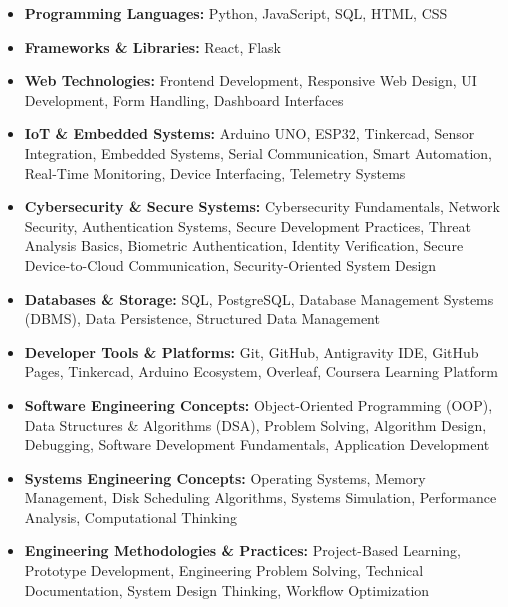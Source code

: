 \documentclass[a4paper,11pt]{article}
\begin{document}
\begin{itemize}[leftmargin=0.15in]

\item \textbf{Programming Languages:}
Python, JavaScript, SQL, HTML, CSS

\item \textbf{Frameworks \& Libraries:}
React, Flask

\item \textbf{Web Technologies:}
Frontend Development, Responsive Web Design, UI Development, Form Handling, Dashboard Interfaces

\item \textbf{IoT \& Embedded Systems:}
Arduino UNO, ESP32, Tinkercad, Sensor Integration, Embedded Systems, Serial Communication, Smart Automation, Real-Time Monitoring, Device Interfacing, Telemetry Systems

\item \textbf{Cybersecurity \& Secure Systems:}
Cybersecurity Fundamentals, Network Security, Authentication Systems, Secure Development Practices, Threat Analysis Basics, Biometric Authentication, Identity Verification, Secure Device-to-Cloud Communication, Security-Oriented System Design

\item \textbf{Databases \& Storage:}
SQL, PostgreSQL, Database Management Systems (DBMS), Data Persistence, Structured Data Management

\item \textbf{Developer Tools \& Platforms:}
Git, GitHub, Antigravity IDE, GitHub Pages, Tinkercad, Arduino Ecosystem, Overleaf, Coursera Learning Platform

\item \textbf{Software Engineering Concepts:}
Object-Oriented Programming (OOP), Data Structures \& Algorithms (DSA), Problem Solving, Algorithm Design, Debugging, Software Development Fundamentals, Application Development

\item \textbf{Systems Engineering Concepts:}
Operating Systems, Memory Management, Disk Scheduling Algorithms, Systems Simulation, Performance Analysis, Computational Thinking

\item \textbf{Engineering Methodologies \& Practices:}
Project-Based Learning, Prototype Development, Engineering Problem Solving, Technical Documentation, System Design Thinking, Workflow Optimization

\end{itemize}
\end{document}
